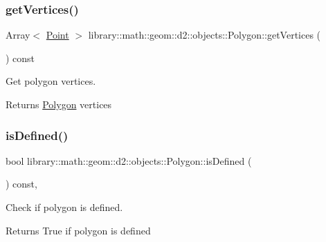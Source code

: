 \subsubsection{\texorpdfstring{get\+Vertices()}{getVertices()}}
{\footnotesize\ttfamily Array$<$ \hyperlink{classlibrary_1_1math_1_1geom_1_1d2_1_1objects_1_1_point}{Point} $>$ library\+::math\+::geom\+::d2\+::objects\+::\+Polygon\+::get\+Vertices (\begin{DoxyParamCaption}{ }\end{DoxyParamCaption}) const}



Get polygon vertices. 


\begin{DoxyCode}
\end{DoxyCode}


\begin{DoxyReturn}{Returns}
\hyperlink{classlibrary_1_1math_1_1geom_1_1d2_1_1objects_1_1_polygon}{Polygon} vertices 
\end{DoxyReturn}
\mbox{\label{classlibrary_1_1math_1_1geom_1_1d2_1_1objects_1_1_polygon_a83e0962f91f0732048e156ad634faaea}} 
\subsubsection{\texorpdfstring{is\+Defined()}{isDefined()}}
{\footnotesize\ttfamily bool library\+::math\+::geom\+::d2\+::objects\+::\+Polygon\+::is\+Defined (\begin{DoxyParamCaption}{ }\end{DoxyParamCaption}) const\hspace{0.3cm}{\ttfamily [override]}, {\ttfamily [virtual]}}



Check if polygon is defined. 


\begin{DoxyCode}
\end{DoxyCode}


\begin{DoxyReturn}{Returns}
True if polygon is defined 
\end{DoxyReturn}


